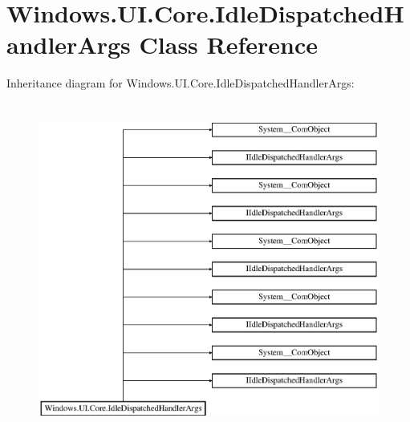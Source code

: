 \hypertarget{class_windows_1_1_u_i_1_1_core_1_1_idle_dispatched_handler_args}{}\section{Windows.\+U\+I.\+Core.\+Idle\+Dispatched\+Handler\+Args Class Reference}
\label{class_windows_1_1_u_i_1_1_core_1_1_idle_dispatched_handler_args}
Inheritance diagram for Windows.\+U\+I.\+Core.\+Idle\+Dispatched\+Handler\+Args\+:\begin{figure}[H]
\begin{center}
\leavevmode
\includegraphics[height=11.000000cm]{class_windows_1_1_u_i_1_1_core_1_1_idle_dispatched_handler_args}
\end{center}
\end{figure}
